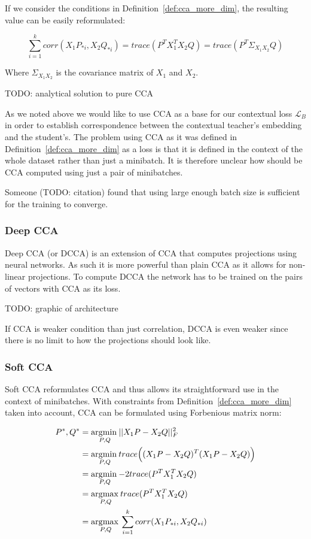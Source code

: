 If we consider the conditions in Definition~\ref{def:cca_more_dim}, the
resulting value can be easily reformulated:

\begin{equation}
    \sum_{i = 1}^k corr(X_1P_{*i}, X_2Q_{*i}) =
    trace(P^TX_1^TX_2Q) =
    trace(P^T\Sigma_{X_1X_2}Q)
\end{equation}

Where $\Sigma_{X_1X_2}$ is the covariance matrix of $X_1$ and $X_2$.

TODO: analytical solution to pure CCA

As we noted above we would like to use CCA as a base for our contextual loss
$\mathcal{L}_B$ in order to establish correspondence between the contextual
teacher's embedding and the student's. The problem using CCA as it was defined
in Definition~\ref{def:cca_more_dim} as a loss is that it is defined in the
context of the whole dataset rather than just a minibatch. It is therefore
unclear how should be CCA computed using just a pair of minibatches.

Someone (TODO: citation) found that using large enough batch size is sufficient
for the training to converge.

\subsubsection{Deep CCA}

Deep CCA (or DCCA) is an extension of CCA that computes projections using
neural networks. As such it is more powerful than plain CCA as it allows for
non-linear projections. To compute DCCA the network has to be trained on the
pairs of vectors with CCA as its loss.

TODO: graphic of architecture

If CCA is weaker condition than just correlation, DCCA is even weaker since
there is no limit to how the projections should look like.

\subsubsection{Soft CCA}

Soft CCA reformulates CCA and thus allows its straightforward use in the
context of minibatches. With constraints from Definition~\ref{def:cca_more_dim}
taken into account, CCA can be formulated using Forbenious matrix norm:

\begin{align}
  P^\ast, Q^\ast &= \underset{P, Q}{\operatorname*{\arg\!\min\medspace}} ||X_1P - X_2Q||^2_F \\
  &= \underset{P, Q}{\operatorname*{\arg\!\min\medspace}} trace\Big((X_1P - X_2Q)^T(X_1P - X_2Q)\Big) \\
  &= \underset{P, Q}{\operatorname*{\arg\!\min\medspace}} {-2} trace(P^TX_1^TX_2Q) \\
  &= \underset{P, Q}{\operatorname*{\arg\!\max\medspace}} trace(P^TX_1^TX_2Q) \\
  &= \underset{P, Q}{\operatorname*{\arg\!\max\medspace}} \sum_{i = 1}^k corr(X_1P_{*i}, X_2Q_{*i})
\end{align}

